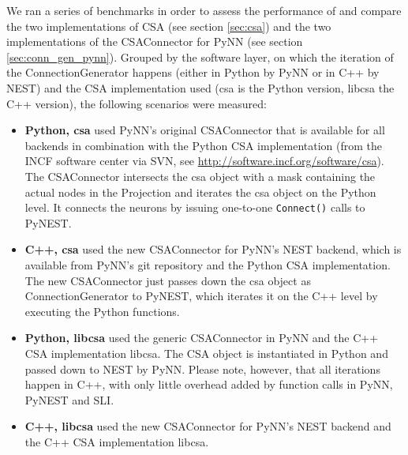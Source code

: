 \documentclass{frontiersSCNS} %
\begin{document}
We ran a series of benchmarks in order to assess the performance of
and compare the two implementations of CSA (see section \ref{sec:csa})
and the two implementations of the CSAConnector for PyNN (see section
\ref{sec:conn_gen_pynn}). Grouped by the software layer, on which the
iteration of the ConnectionGenerator happens (either in Python by PyNN
or in C++ by NEST) and the CSA implementation used (csa is the Python
version, libcsa the C++ version), the following scenarios were
measured:

\begin{itemize}
\item \textbf{Python, csa} used PyNN's original CSAConnector that
  is available for all backends in combination with the Python CSA
  implementation (from the INCF software center via SVN, see
  \url{http://software.incf.org/software/csa}). The CSAConnector
  intersects the csa object with a mask containing the actual nodes in
  the Projection and iterates the csa object on the Python level. It
  connects the neurons by issuing one-to-one \verb|Connect()| calls to
  PyNEST.
\item \textbf{C++, csa} used the new CSAConnector for PyNN's NEST
  backend, which is available from PyNN's git repository and the
  Python CSA implementation. The new CSAConnector just passes down the
  csa object as ConnectionGenerator to PyNEST, which iterates it on
  the C++ level by executing the Python functions.
\item \textbf{Python, libcsa} used the generic CSAConnector in PyNN and
  the C++ CSA implementation libcsa. The CSA object is instantiated in
  Python and passed down to NEST by PyNN. Please note, however, that
  all iterations happen in C++, with only little overhead added by
  function calls in PyNN, PyNEST and SLI.
\item \textbf{C++, libcsa} used the new CSAConnector for PyNN's NEST
  backend and the C++ CSA implementation libcsa.
\end{itemize}
\end{document}
